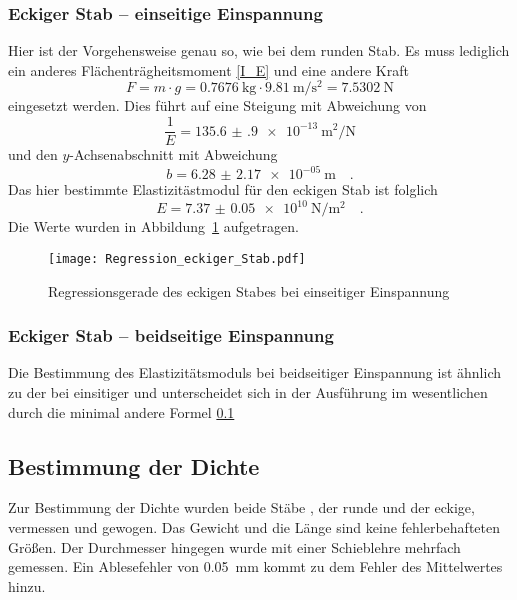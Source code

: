 \subsubsection{Eckiger Stab -- einseitige Einspannung}
Hier ist der Vorgehensweise genau so, wie bei dem runden Stab. Es muss lediglich ein anderes Flächenträgheitsmoment \ref{I_E} und eine andere Kraft
\begin{equation}
  F = m \cdot g = \SI{0.7676}{\kilo\gram} \cdot \SI{9.81}{\metre\per\second\squared} = \SI{7.5302}{\newton}
\end{equation}
eingesetzt werden.
Dies führt auf eine Steigung mit Abweichung von
\begin{equation}
  \frac{1}{E}= \SI{135.6(9)e-13}{\metre\squared\per\newton}
\end{equation}
und den $y$-Achsenabschnitt mit Abweichung
\begin{equation}
  b = \SI{6.28(217)e-05}{\metre} \quad.
\end{equation}
Das hier bestimmte Elastizitästmodul für den eckigen Stab ist folglich
\begin{equation}
  E = \SI{7.37(5)e+10}{\newton\per\metre\squared} \quad.
\end{equation}
Die Werte wurden in Abbildung~\ref{fig:Regression_eckiger_Stab} aufgetragen.

\begin{figure}[h!]
\centering
\texttt{[image: Regression\_eckiger\_Stab.pdf]}
\caption{Regressionsgerade des eckigen Stabes bei einseitiger Einspannung}
\label{fig:Regression_eckiger_Stab}
\end{figure}







\subsubsection{Eckiger Stab -- beidseitige Einspannung}
Die Bestimmung des Elastizitätsmoduls bei beidseitiger Einspannung ist ähnlich zu der bei einsitiger und unterscheidet sich in der Ausführung im wesentlichen durch die minimal andere Formel \ref{}









\subsection{Bestimmung der Dichte}
Zur Bestimmung der Dichte wurden beide Stäbe , der runde und der eckige, vermessen und gewogen. Das Gewicht und die Länge sind keine fehlerbehafteten Größen. Der Durchmesser hingegen wurde mit einer Schieblehre mehrfach gemessen. Ein Ablesefehler von \SI{0.05}{\milli\metre}  kommt zu dem Fehler des Mittelwertes hinzu.
